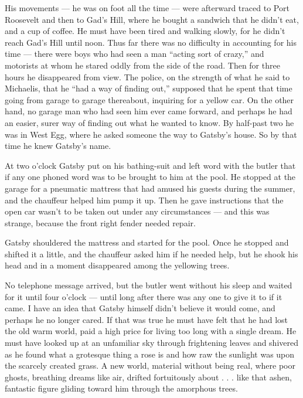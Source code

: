 \documentclass{znotebook}
\begin{document}
His movements ---{} he was on foot all the time ---{} were afterward traced to Port Roosevelt and then to Gad's Hill, where he bought a sandwich that he didn't eat, and a cup of coffee. He must have been tired and walking slowly, for he didn't reach Gad's Hill until noon. Thus far there was no difficulty in accounting for his time ---{} there were boys who had seen a man ``acting sort of crazy,'' and motorists at whom he stared oddly from the side of the road. Then for three hours he disappeared from view. The police, on the strength of what he said to Michaelis, that he ``had a way of finding out,'' supposed that he spent that time going from garage to garage thereabout, inquiring for a yellow car. On the other hand, no garage man who had seen him ever came forward, and perhaps he had an easier, surer way of finding out what he wanted to know. By half-past two he was in West Egg, where he asked someone the way to Gatsby's house. So by that time he knew Gatsby's name.

At two o'clock Gatsby put on his bathing-suit and left word with the butler that if any one phoned word was to be brought to him at the pool. He stopped at the garage for a pneumatic mattress that had amused his guests during the summer, and the chauffeur helped him pump it up. Then he gave instructions that the open car wasn't to be taken out under any circumstances ---{} and this was strange, because the front right fender needed repair.

Gatsby shouldered the mattress and started for the pool. Once he stopped and shifted it a little, and the chauffeur asked him if he needed help, but he shook his head and in a moment disappeared among the yellowing trees.

No telephone message arrived, but the butler went without his sleep and waited for it until four o'clock ---{} until long after there was any one to give it to if it came. I have an idea that Gatsby himself didn't believe it would come, and perhaps he no longer cared. If that was true he must have felt that he had lost the old warm world, paid a high price for living too long with a single dream. He must have looked up at an unfamiliar sky through frightening leaves and shivered as he found what a grotesque thing a rose is and how raw the sunlight was upon the scarcely created grass. A new world, material without being real, where poor ghosts, breathing dreams like air, drifted fortuitously about . . . like that ashen, fantastic figure gliding toward him through the amorphous trees.
\end{document}
